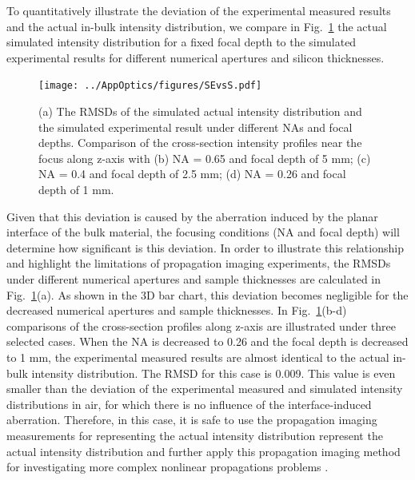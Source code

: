 \documentclass[9pt,twocolumn,twoside]{osajnl}
\begin{document}
To quantitatively illustrate the deviation of the experimental measured results and the actual in-bulk intensity distribution, we compare in Fig.~\ref{fig:6} the actual simulated intensity distribution for a fixed focal depth to the simulated experimental results for different numerical apertures and silicon thicknesses.

\begin{figure}[ht]
	\centering
	\texttt{[image: ../AppOptics/figures/SEvsS.pdf]}
	\caption{(a) The RMSDs of the simulated actual intensity distribution and the simulated experimental result under different NAs and focal depths. Comparison of the cross-section intensity profiles near the focus along z-axis with (b) NA = 0.65 and focal depth of 5 mm; (c) NA = 0.4 and focal depth of 2.5 mm; (d) NA = 0.26 and focal depth of 1 mm.}\label{fig:6}
\end{figure}

Given that this deviation is caused by the aberration induced by the planar interface of the bulk material, the focusing conditions (NA and focal depth) will determine how significant is this deviation. In order to illustrate this relationship and highlight the limitations of propagation imaging experiments, the RMSDs under different numerical apertures and sample thicknesses are calculated in Fig.~\ref{fig:6}(a). As shown in the 3D bar chart, this deviation becomes negligible for the decreased numerical apertures and sample thicknesses. 
In Fig.~\ref{fig:6}(b-d) comparisons of the cross-section profiles along z-axis are illustrated under three selected cases. When the NA is decreased to 0.26 and the focal depth is decreased to 1 mm, the experimental measured results are almost identical to the actual in-bulk intensity distribution. The RMSD for this case is 0.009. This value is even smaller than the deviation of the experimental measured and simulated intensity distributions in air, for which there is no influence of the interface-induced aberration. Therefore, in this case, it is safe to use the propagation imaging measurements for representing the actual intensity distribution represent the actual intensity distribution and further apply this propagation imaging method for investigating more complex nonlinear propagations problems \cite{Chambonneau2020}.
\end{document}

